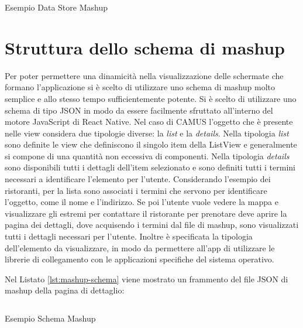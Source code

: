 \begin{listing}[H]
	\inputminted{json}{6-implementazione-app/Codice/store-two-topics.json}
	\caption{Esempio Data Store Mashup}
	\label{lst:store-two-topics}
\end{listing}

\section{Struttura dello schema di mashup}

Per poter permettere una dinamicità nella visualizzazione delle schermate che formano l'applicazione si è scelto di utilizzare uno schema di mashup molto semplice e allo stesso tempo sufficientemente potente. Si è scelto di utilizzare uno schema di tipo JSON in modo da essere facilmente sfruttato all'interno del motore JavaScript di React Native. 
Nel caso di CAMUS l'oggetto che è presente nelle view considera due tipologie diverse: la \emph{list} e la \emph{details}. Nella tipologia \emph{list} sono definite le view che definiscono il singolo item della ListView e generalmente si compone di una quantità non eccessiva di componenti.
Nella tipologia \emph{details} sono disponibili tutti i dettagli dell'item selezionato e sono definiti tutti i termini necessari a identificare l'elemento per l'utente.
Considerando l'esempio dei ristoranti, per la lista sono associati i termini che servono per identificare l'oggetto, come il nome e l'indirizzo. Se poi l'utente vuole vedere la mappa e visualizzare gli estremi per contattare il ristorante per prenotare deve aprire la pagina dei dettagli, dove acquisendo i termini dal file di mashup, sono visualizzati tutti i dettagli necessari per l'utente. Inoltre è specificata la tipologia dell'elemento da visualizzare, in modo da permettere all'app di utilizzare le librerie di collegamento con le applicazioni specifiche del sistema operativo.

Nel Listato \ref{lst:mashup-schema} viene mostrato un frammento del file JSON di mashup della pagina di dettaglio:
\begin{listing}[H]
	\inputminted{json}{6-implementazione-app/Codice/mashup-schema-example-app.json}
	\caption{Esempio Schema Mashup}
	\label{lst:mashup-schema}
\end{listing}

